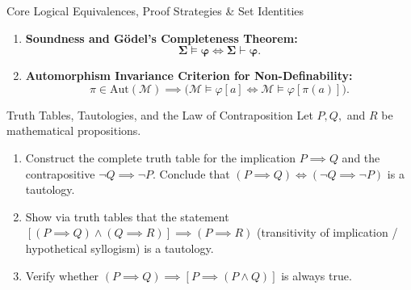 \begin{quicksummary}{Core Logical Equivalences, Proof Strategies \& Set Identities}
\begin{enumerate}[leftmargin=1.4em,itemsep=3pt]
  \[
  \Sigma \text{ is satisfiable} \iff \text{every finite subset } \Sigma_0 \subseteq \Sigma \text{ is satisfiable.}
  \]
  \[
  \Sigma \models \varphi \iff \exists \Sigma_0 \subseteq_{\mathrm{fin}} \Sigma \text{ such that } \Sigma_0 \models \varphi.
  \]
  \item \textbf{Soundness and G\"odel's Completeness Theorem:}
  \[
  \mathbf{\Sigma \models \varphi \iff \Sigma \vdash \varphi}.
  \]
  \item \textbf{Automorphism Invariance Criterion for Non-Definability:}
  \[
  \pi \in \mathrm{Aut}(\mathcal{M}) \implies \bigl(\mathcal{M} \models \varphi[a] \iff \mathcal{M} \models \varphi[\pi(a)]\bigr).
  \]
\end{enumerate}
\end{quicksummary}

\vspace{10pt}

\begin{exercise}{Truth Tables, Tautologies, and the Law of Contraposition}
Let $P, Q,$ and $R$ be mathematical propositions.
\begin{enumerate}[leftmargin=1.5em,itemsep=2pt]
  \item Construct the complete truth table for the implication $P \implies Q$ and the contrapositive $\neg Q \implies \neg P$. Conclude that $(P \implies Q) \iff (\neg Q \implies \neg P)$ is a tautology.
  \item Show via truth tables that the statement $[(P \implies Q) \land (Q \implies R)] \implies (P \implies R)$ (transitivity of implication / hypothetical syllogism) is a tautology.
  \item Verify whether $(P \implies Q) \implies [P \implies (P \land Q)]$ is always true.
\end{enumerate}
\end{exercise}

\begin{tabletworkspace}[5.0cm]
\end{tabletworkspace}


